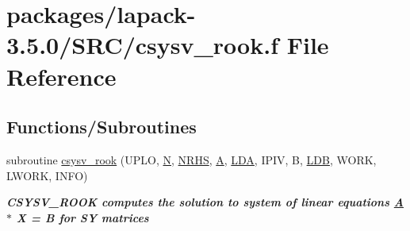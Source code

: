 \hypertarget{csysv__rook_8f}{}\section{packages/lapack-\/3.5.0/\+S\+R\+C/csysv\+\_\+rook.f File Reference}
\label{csysv__rook_8f}
\subsection*{Functions/\+Subroutines}
\begin{DoxyCompactItemize}
\item 
subroutine \hyperlink{group__complexSYsolve_gaadb410c9b1f28931fe04501234603985}{csysv\+\_\+rook} (U\+P\+L\+O, \hyperlink{polmisc_8c_a0240ac851181b84ac374872dc5434ee4}{N}, \hyperlink{example__user_8c_aa0138da002ce2a90360df2f521eb3198}{N\+R\+H\+S}, \hyperlink{classA}{A}, \hyperlink{example__user_8c_ae946da542ce0db94dced19b2ecefd1aa}{L\+D\+A}, I\+P\+I\+V, B, \hyperlink{example__user_8c_a50e90a7104df172b5a89a06c47fcca04}{L\+D\+B}, W\+O\+R\+K, L\+W\+O\+R\+K, I\+N\+F\+O)
\begin{DoxyCompactList}\small\item\em {\bfseries  C\+S\+Y\+S\+V\+\_\+\+R\+O\+O\+K computes the solution to system of linear equations \hyperlink{classA}{A} $\ast$ X = B for S\+Y matrices} \end{DoxyCompactList}\end{DoxyCompactItemize}
